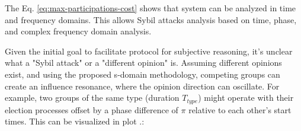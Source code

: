 \documentclass{article}
\begin{document}
\begin{CJK}{UTF8}{gbsn}
        The Eq. \ref{eq:max-participations-cost} shows that system can be analyzed in time and frequency domains. This allows Sybil attacks analysis based on time, phase, and complex frequency domain analysis.

        Given the initial goal to facilitate protocol for subjective reasoning, it's unclear what a "Sybil attack" or a "different opinion" is. Assuming different opinions exist, and using the proposed s-domain methodology, competing groups can create an influence resonance, where the opinion direction can oscillate. For example, two groups of the same type (duration $T_{type}$) might operate with their election processes offset by a phase difference of $\pi$ relative to each other's start times. This can be visualized in plot .:

        \begin{figure}[ht]
            \centering
\end{figure}
\end{CJK}
\end{document}
